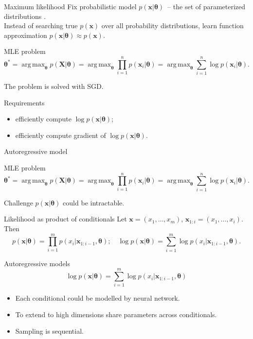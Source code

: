 \documentclass{beamer}
\newcommand{\bx}{\mathbf{x}}
\newcommand{\bX}{\mathbf{X}}
\newcommand{\btheta}{\boldsymbol{\theta}}
\DeclareMathOperator*{\argmax}{arg\,max}
\begin{document}
\begin{frame}{Maximum likelihood}
    Fix probabilistic model $p(\bx | \btheta)$~-- the set of parameterized distributions . \\
    Instead of searching true $p(\bx)$ over all probability distributions, learn function approximation $p(\bx | \btheta) \approx p(\bx)$.
    
    \begin{block}{MLE problem}
    \vspace{-0.3cm}
    \[
        \btheta^* = \argmax_{\btheta} p(\bX | \btheta) = \argmax_{\btheta} \prod_{i=1}^n p(\bx_i | \btheta) = \argmax_{\btheta} \sum_{i=1}^n \log p(\bx_i | \btheta).
    \]
    \vspace{-0.1cm}
    \end{block}
    
    The problem is solved with SGD.
    \begin{block}{Requirements}
        \begin{itemize}
            \item efficiently compute $\log p(\bx | \btheta)$;
            \item efficiently compute gradient of $\log p(\bx | \btheta)$.
        \end{itemize}
    \end{block}
\end{frame}
\begin{frame}{Autoregressive model}
    \begin{block}{MLE problem}
    \vspace{-0.3cm}
    \[
        \btheta^* = \argmax_{\btheta} p(\bX | \btheta) = \argmax_{\btheta} \prod_{i=1}^n p(\bx_i | \btheta) = \argmax_{\btheta} \sum_{i=1}^n \log p(\bx_i | \btheta).
    \]
    \vspace{-0.1cm}
    \end{block}
    \begin{block}{Challenge}
    $p(\bx | \btheta)$ could be intractable.
    \end{block}
    \begin{block}{Likelihood as product of conditionals}
    Let $\bx = (x_1, \dots, x_m)$, $\bx_{1:i} = (x_1, \dots, x_i)$. Then 
    \[
        p(\bx | \btheta) = \prod_{i=1}^m p(x_i | \bx_{1:i - 1}, \btheta); \quad 
        \log p(\bx | \btheta) = \sum_{i=1}^m \log p(x_i | \bx_{1:i - 1}, \btheta).
    \]
    \end{block}
\end{frame}
\begin{frame}{Autoregressive models}
    \[
    \log p(\bx| \btheta) = \sum_{i=1}^m \log p(x_i | \bx_{1:i - 1}, \btheta)
    \]
    \begin{itemize}
        \item Each conditional could be modelled by neural network.
        \item To extend to high dimensions share parameters across conditionals.
        \item Sampling is sequential.
    \end{itemize}
    
\end{frame}
\end{document}
